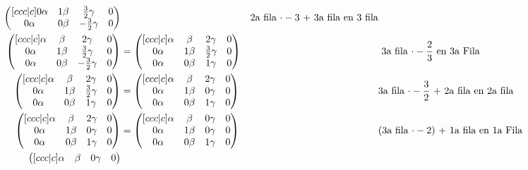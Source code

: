 \documentclass[letterpaper]{article}
\renewcommand{\*}{\cdot}
\theoremstyle{definition}
\begin{document}
\begin{align*}
\begin{pmatrix}[ccc|c]
			 0\alpha & 1\beta & \frac{3}{2}\gamma & 0\\
			 0\alpha & 0\beta & -\frac{3}{2}\gamma & 0
			 \end{pmatrix} && \text{2a fila $ \* -3 $ + 3a fila en 3 fila}\\
			 \begin{pmatrix}[ccc|c]
			 \alpha & \beta & 2\gamma & 0\\
			 0\alpha & 1\beta & \frac{3}{2}\gamma & 0\\
			 0\alpha & 0\beta & -\frac{3}{2}\gamma & 0
			 \end{pmatrix} & = \begin{pmatrix}[ccc|c]
			 \alpha & \beta & 2\gamma & 0\\
			 0\alpha & 1\beta & \frac{3}{2}\gamma & 0\\
			 0\alpha & 0\beta & 1\gamma & 0
			 \end{pmatrix} && \text{ 3a fila $ \* -\dfrac{2}{3} $ en 3a Fila}\\		 
			 \begin{pmatrix}[ccc|c]
			 \alpha & \beta & 2\gamma &0\\
			 0\alpha & 1\beta & \frac{3}{2}\gamma & 0\\
			 0\alpha & 0\beta & 1\gamma & 0
			 \end{pmatrix} & = \begin{pmatrix}[ccc|c]
			 \alpha & \beta & 2\gamma &0\\
			 0\alpha & 1\beta & 0\gamma & 0\\
			 0\alpha & 0\beta & 1\gamma & 0
			 \end{pmatrix} && \text{3a fila $ \* -\dfrac{3}{2} $ + 2a fila en 2a fila}\\
			 \begin{pmatrix}[ccc|c]
			 \alpha & \beta & 2\gamma & 0\\
			 0\alpha & 1\beta & 0\gamma & 0\\
			 0\alpha & 0\beta & 1\gamma & 0
			 \end{pmatrix} & = \begin{pmatrix}[ccc|c]
			 \alpha & \beta & 0\gamma & 0\\
			 0\alpha & 1\beta & 0\gamma & 0\\
			 0\alpha & 0\beta & 1\gamma & 0
			 \end{pmatrix} && \text{(3a fila $ \* -2 $) + 1a fila en 1a Fila}   \\
			 \begin{pmatrix}[ccc|c]
			 \alpha & \beta & 0\gamma & 0\\

\end{pmatrix}
\end{align*}
\end{document}
